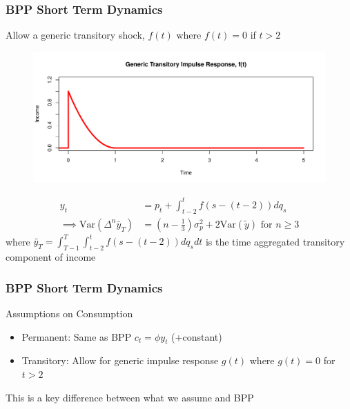 \documentclass{beamer}
\begin{document}
\frame
{
	\frametitle{BPP Short Term Dynamics}
	Allow a generic transitory shock, $f(t)$ where $f(t)=0$ if $t>2$
	\begin{figure}
		\includegraphics[scale=0.3]{../Figures/GenericTransitory.png}
	\end{figure}
	\vspace*{-0.3in}
	\begin{align*}
	y_t &= p_t + \int_{t-2}^{t} f(s-(t-2))dq_s\\
	\implies \mathrm{Var}(\Delta^n \bar{y}_T) &= (n-\frac{1}{3})\sigma^2_p +  2 \mathrm{Var}(\tilde{y}) \text{   for }n \geq 3
	\end{align*}	
	where $	\tilde{y_T} = \int_{T-1}^{T}\int_{t-2}^{t} f(s-(t-2))dq_s dt$ is the time aggregated transitory component of income
}
\frame
{
	\frametitle{BPP Short Term Dynamics}
	Assumptions on Consumption\\
	\begin{itemize}
		\item Permanent: Same as BPP $c_t = \phi y_t$ (+constant)
		\item Transitory: Allow for generic impulse response $g(t)$ where $g(t) = 0$ for $t>2$
	\end{itemize}
	\vspace*{-0.2in}
	\begin{center}
	\end{center}
	\vspace*{-0.2in}
	This is a key difference between what we assume and BPP
}
\end{document}
